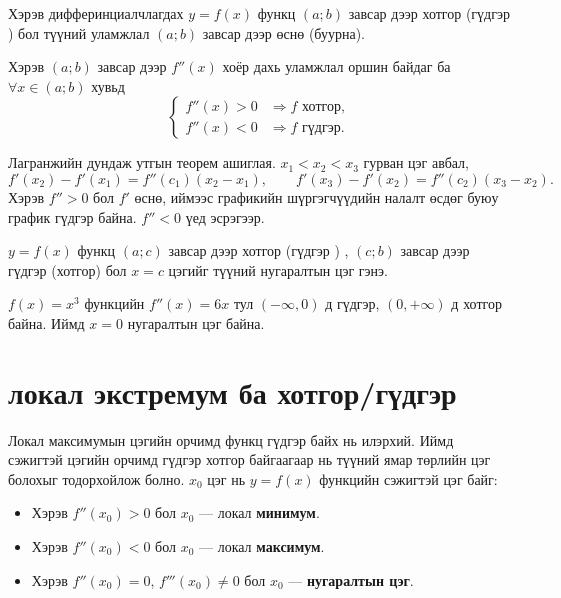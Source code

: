 \begin{theorem}
    Хэрэв дифферинциалчлагдах $y=f(x)$ функц $(a;b)$  завсар дээр хотгор (гүдгэр ) бол түүний  уламжлал $(a;b)$ завсар дээр өснө (буурна).
\end{theorem}

\begin{theorem}
Хэрэв $(a;b)$  завсар дээр $f''(x)$ хоёр дахь уламжлал оршин байдаг ба $\forall x\in (a;b)$ хувьд
\[
\begin{cases}
f''(x)>0 &\Rightarrow f \text{ хотгор},\\[4pt]
f''(x)<0 &\Rightarrow f \text{ гүдгэр}.
\end{cases}
\]
\end{theorem}

\begin{prof}
Лагранжийн дундаж утгын теорем ашиглая.
$x_1<x_2<x_3$ гурван цэг авбал,
\[
f'(x_2)-f'(x_1)=f''(c_1)(x_2-x_1),\qquad
f'(x_3)-f'(x_2)=f''(c_2)(x_3-x_2).
\]
Хэрэв $f''>0$ бол $f'$ өснө, иймээс графикийн шүргэгчүүдийн налалт өсдөг буюу график гүдгэр байна. $f''<0$ үед эсрэгээр.
\end{prof}
\begin{definition}
    $y=f(x)$ функц $(a;c)$ завсар дээр хотгор (гүдгэр ) , $(c;b)$ завсар дээр  гүдгэр  (хотгор)  бол $x=c$ цэгийг түүний нугаралтын цэг гэнэ.
\end{definition}
\begin{example}
$f(x)=x^3$ функцийн $f''(x)=6x$ тул $(-\infty,0)$ д гүдгэр, $(0,+\infty)$ д хотгор байна. Иймд $x=0$ нугаралтын цэг байна.
\end{example}

\begin{center}
\end{center}
\section{локал экстремум ба хотгор/гүдгэр}
Локал максимумын цэгийн орчимд функц гүдгэр байх нь илэрхий. Иймд сэжигтэй цэгийн орчимд гүдгэр хотгор байгаагаар нь түүний ямар төрлийн цэг болохыг тодорхойлож болно.  
$x_0$ цэг нь $y=f(x)$ функцийн сэжигтэй цэг байг:
\begin{itemize}
  \item Хэрэв $f''(x_0)>0$ бол $x_0$ — локал \textbf{минимум}.
  \item Хэрэв $f''(x_0)<0$ бол $x_0$ — локал \textbf{максимум}.
  \item Хэрэв $f''(x_0)=0$, $f'''(x_0)\ne0$ бол $x_0$ — \textbf{нугаралтын цэг}.
\end{itemize}

